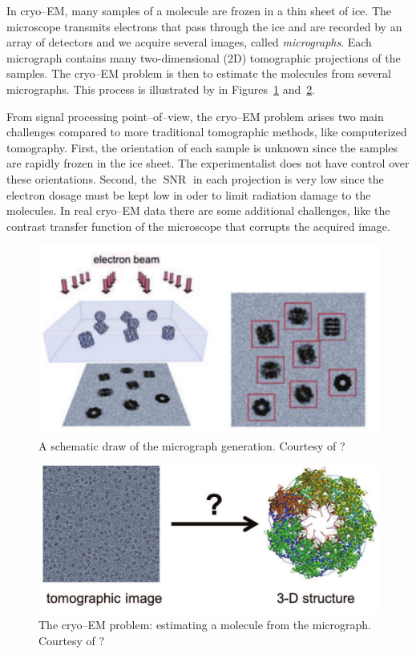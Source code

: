 \documentclass[journal]{IEEEtran}
\numberwithin{equation}{section}
\numberwithin{figure}{section}
\theoremstyle{plain}
\theoremstyle{definition}
\theoremstyle{remark}
\theoremstyle{plain}
\theoremstyle{remark}
\theoremstyle{plain}
\theoremstyle{plain}
\newcommand{\SNR}{\operatorname{SNR}}
\begin{document}
In cryo--EM, many samples of a molecule are frozen in a thin sheet of ice. 
The microscope transmits electrons that pass through the ice and are recorded by an array of detectors and we acquire  several images, called \emph{micrographs}. Each micrograph  contains many two-dimensional (2D) tomographic projections of the samples. 
 The  cryo--EM problem is then to estimate the molecules from several micrographs. This process is illustrated by in Figures~\ref{fig:cryo-EM} and~\ref{fig:cryo-EM-problem}. 

From signal processing point--of--view, the cryo--EM problem arises two main challenges compared to more traditional tomographic methods, like computerized tomography. First, the orientation of each sample is unknown since the samples are rapidly frozen in the ice sheet. The experimentalist does not have control over these orientations. Second, the $\SNR$ in each projection is very low since the electron dosage must be kept low in oder to limit  radiation damage to the molecules. In real cryo--EM data there are some additional challenges, like the contrast transfer function of the microscope that corrupts the acquired image. 


\begin{figure}
	\begin{center}
		\includegraphics[scale = .4]{cryoem-eps-converted-to}
	\end{center}
	\caption{A schematic draw of the micrograph generation. Courtesy of ?}
	\label{fig:cryo-EM}
\end{figure}

\begin{figure}
	\begin{center}
		\includegraphics[scale = .35]{cryoem-problem-eps-converted-to}		
	\end{center}
	\caption{The cryo--EM problem: estimating a molecule from the micrograph. Courtesy of ?}
	\label{fig:cryo-EM-problem}
\end{figure}
\end{document}
